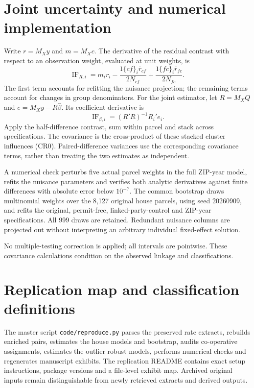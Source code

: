 \documentclass[12pt]{article}
\begin{document}
\section{Joint uncertainty and numerical implementation}
Write $r=M_Xy$ and $m=M_Xc$. The derivative of the residual contrast with respect to an observation weight, evaluated at unit weights, is
\begin{equation}
\operatorname{IF}_{R,i}=m_i r_i-\frac{1\{cf\}_i\bar r_{cf}}{2N_{cf}}+\frac{1\{fc\}_i\bar r_{fc}}{2N_{fc}}.
\end{equation}
The first term accounts for refitting the nuisance projection; the remaining terms account for changes in group denominators. For the joint estimator, let $R=M_XQ$ and $e=M_Xy-R\widehat\beta$. Its coefficient derivative is
\begin{equation}
\operatorname{IF}_{\beta,i}=(R'R)^{-1}R_i'e_i.
\end{equation}
Apply the half-difference contrast, sum within parcel and stack across specifications. The covariance is the cross-product of these stacked cluster influences (CR0). Paired-difference variances use the corresponding covariance terms, rather than treating the two estimates as independent.

A numerical check perturbs five actual parcel weights in the full ZIP-year model, refits the nuisance parameters and verifies both analytic derivatives against finite differences with absolute error below $10^{-7}$. The common bootstrap draws multinomial weights over the 8,127 original house parcels, using seed 20260909, and refits the original, permit-free, linked-party-control and ZIP-year specifications. All 999 draws are retained. Redundant nuisance columns are projected out without interpreting an arbitrary individual fixed-effect solution.

No multiple-testing correction is applied; all intervals are pointwise. These covariance calculations condition on the observed linkage and classifications.

\section{Replication map and classification definitions}
The master script \texttt{code/reproduce.py} parses the preserved rate extracts, rebuilds enriched pairs, estimates the house models and bootstrap, audits co-operative assignments, estimates the outlier-robust models, performs numerical checks and regenerates manuscript exhibits. The replication README contains exact setup instructions, package versions and a file-level exhibit map. Archived original inputs remain distinguishable from newly retrieved extracts and derived outputs.
\end{document}
